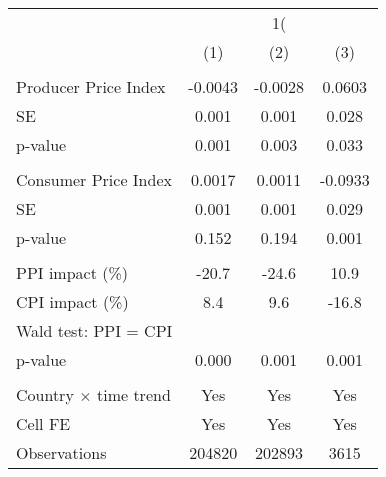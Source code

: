 {
\def\sym#1{\ifmmode^{#1}\else\(^{#1}\)\fi}
\begin{tabular}{l*{3}{c}}
\hline\hline
                    &&&\\\cmidrule(lr){2-2}\cmidrule(lr){3-3}\cmidrule(lr){4-4}
                    &         &         &         \\
\hline
\hline
\\ Producer Price Index&     -0.0043         &     -0.0028         &      0.0603         \\
\hspace{15pt} SE    &       0.001         &       0.001         &       0.028         \\
\hspace{15pt} p-value&       0.001         &       0.003         &       0.033         \\
\\ Consumer Price Index&      0.0017         &      0.0011         &     -0.0933         \\
\hspace{15pt} SE    &       0.001         &       0.001         &       0.029         \\
\hspace{15pt} p-value&       0.152         &       0.194         &       0.001         \\
\hline \\ PPI impact (\%)&       -20.7         &       -24.6         &        10.9         \\
CPI impact (\%)     &         8.4         &         9.6         &       -16.8         \\
Wald test: PPI = CPI&                     &                     &                     \\
\hspace{15pt} p-value&       0.000         &       0.001         &       0.001         \\
\hline \\ Country $\times$ time trend&         Yes         &         Yes         &         Yes         \\
Cell FE             &         Yes         &         Yes         &         Yes         \\
Observations        &      204820         &      202893         &        3615         \\
\hline\hline
\end{tabular}
}
